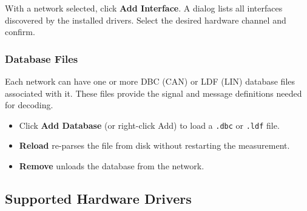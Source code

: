 \documentclass[a4paper,11pt]{article}
\newcommand{\ui}[1]{\textbf{#1}}
\newcommand{\file}[1]{\texttt{#1}}
\begin{document}
With a network selected, click \ui{Add Interface}. A dialog lists all interfaces
discovered by the installed drivers. Select the desired hardware channel and confirm.

\subsubsection{Database Files}

Each network can have one or more DBC (CAN) or LDF (LIN) database files associated
with it. These files provide the signal and message definitions needed for decoding.

\begin{itemize}
  \item Click \ui{Add Database} (or right-click \textrightarrow{} Add) to load a \file{.dbc}
        or \file{.ldf} file.
  \item \ui{Reload} re-parses the file from disk without restarting the measurement.
  \item \ui{Remove} unloads the database from the network.
\end{itemize}

\subsection{Supported Hardware Drivers}
\label{sec:drivers}
\end{document}
